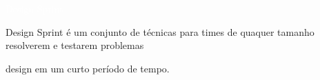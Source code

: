 \newcommand{\textBox}[1]{
\hspace*{7pt}
\begin{tabular}{  p{\dimexpr 0.97\linewidth-2\tabcolsep} }
  	{\normalsize #1}
\end{tabular}
\vspace*{10pt}
}

\newcommand{\designEntry}[2]{
	$\begin{array}{l}
	{\texttt{[image: \#1]}}
	\end{array}
	$ #2
}
\LARGE
\noindent\colorbox{materialYellow}
{\parbox[c][25pt][c]{\textwidth}{\hspace{15pt}\textcolor{white}{Design Sprint}}} %

\large
\vspace*{10pt}

\textcolor{materialYellow}{Design Sprint} é um conjunto de técnicas para times
de quaquer tamanho resolverem e testarem problemas

\vspace*{10pt}

design em um curto período de tempo.

\vspace*{10pt}
